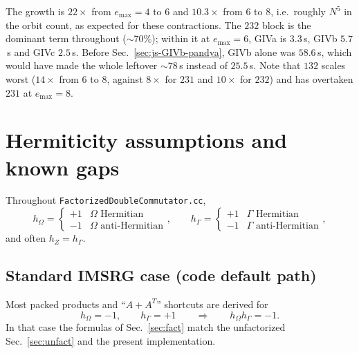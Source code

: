 \documentclass[enabledeprecatedfontcommands]{scrartcl}
\newcommand{\codename}[1]{\texttt{#1}}
\begin{document}
The growth is $22\times$ from $e_{\max}=4$ to $6$ and $10.3\times$ from
$6$ to $8$, i.e.\ roughly $N^{5}$ in the orbit count, as expected for
these contractions. The $232$ block is the dominant term throughout
($\sim70\%$); within it at $e_{\max}=6$, GIVa is $3.3$\,s, GIVb
$5.7$\,s and GIVc $2.5$\,s. Before Sec.~\ref{sec:js-GIVb-pandya}, GIVb
alone was $58.6$\,s, which would have made the whole leftover
$\sim78$\,s instead of $25.5$\,s. Note that $132$ scales worst
($14\times$ from $6$ to $8$, against $8\times$ for $231$ and $10\times$
for $232$) and has overtaken $231$ at $e_{\max}=8$.

\section{Hermiticity assumptions and known gaps}
\label{sec:herm}

Throughout \codename{FactorizedDoubleCommutator.cc},
\begin{equation}
  h_\Omega=\begin{cases}+1&\Omega\text{ Hermitian}\\-1&\Omega\text{ anti-Hermitian}\end{cases},
  \qquad
  h_\Gamma=\begin{cases}+1&\Gamma\text{ Hermitian}\\-1&\Gamma\text{ anti-Hermitian}\end{cases},
\end{equation}
and often $h_Z=h_\Gamma$.

\subsection{Standard IMSRG case (code default path)}
Most packed products and ``$A+A^{T}$'' shortcuts are derived for
\begin{equation}
  h_\Omega=-1,\qquad h_\Gamma=+1
  \qquad\Rightarrow\qquad h_\Omega h_\Gamma=-1.
\end{equation}
In that case the formulas of Sec.~\ref{sec:fact} match the unfactorized
Sec.~\ref{sec:unfact} and the present implementation.
\end{document}
